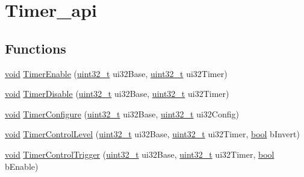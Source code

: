 \hypertarget{group__timer__api}{}\section{Timer\+\_\+api}
\label{group__timer__api}
\subsection*{Functions}
\begin{DoxyCompactItemize}
\item 
\hyperlink{usb__devapi_8h_afabf60e7f57651d6d595a02c75f07cd0}{void} \hyperlink{group__timer__api_ga13a66ae0ebdd8467176d85e057ed212c}{Timer\+Enable} (\hyperlink{_p_e___types_8h_a33594304e786b158f3fb30289278f5af}{uint32\+\_\+t} ui32\+Base, \hyperlink{_p_e___types_8h_a33594304e786b158f3fb30289278f5af}{uint32\+\_\+t} ui32\+Timer)
\item 
\hyperlink{usb__devapi_8h_afabf60e7f57651d6d595a02c75f07cd0}{void} \hyperlink{group__timer__api_gaf0fe4544704e7015716be1afbd995add}{Timer\+Disable} (\hyperlink{_p_e___types_8h_a33594304e786b158f3fb30289278f5af}{uint32\+\_\+t} ui32\+Base, \hyperlink{_p_e___types_8h_a33594304e786b158f3fb30289278f5af}{uint32\+\_\+t} ui32\+Timer)
\item 
\hyperlink{usb__devapi_8h_afabf60e7f57651d6d595a02c75f07cd0}{void} \hyperlink{group__timer__api_ga906bd1ce13ef11046b0d4b2722f3a9a8}{Timer\+Configure} (\hyperlink{_p_e___types_8h_a33594304e786b158f3fb30289278f5af}{uint32\+\_\+t} ui32\+Base, \hyperlink{_p_e___types_8h_a33594304e786b158f3fb30289278f5af}{uint32\+\_\+t} ui32\+Config)
\item 
\hyperlink{usb__devapi_8h_afabf60e7f57651d6d595a02c75f07cd0}{void} \hyperlink{group__timer__api_ga5b4ed705f77f9b4ac9e4180c0d038e98}{Timer\+Control\+Level} (\hyperlink{_p_e___types_8h_a33594304e786b158f3fb30289278f5af}{uint32\+\_\+t} ui32\+Base, \hyperlink{_p_e___types_8h_a33594304e786b158f3fb30289278f5af}{uint32\+\_\+t} ui32\+Timer, \hyperlink{_p_e___types_8h_a97a80ca1602ebf2303258971a2c938e2}{bool} b\+Invert)
\item 
\hyperlink{usb__devapi_8h_afabf60e7f57651d6d595a02c75f07cd0}{void} \hyperlink{group__timer__api_gaf4ae82873e7e2940b136302d4f6404bb}{Timer\+Control\+Trigger} (\hyperlink{_p_e___types_8h_a33594304e786b158f3fb30289278f5af}{uint32\+\_\+t} ui32\+Base, \hyperlink{_p_e___types_8h_a33594304e786b158f3fb30289278f5af}{uint32\+\_\+t} ui32\+Timer, \hyperlink{_p_e___types_8h_a97a80ca1602ebf2303258971a2c938e2}{bool} b\+Enable)
\item 

\end{DoxyCompactItemize}
